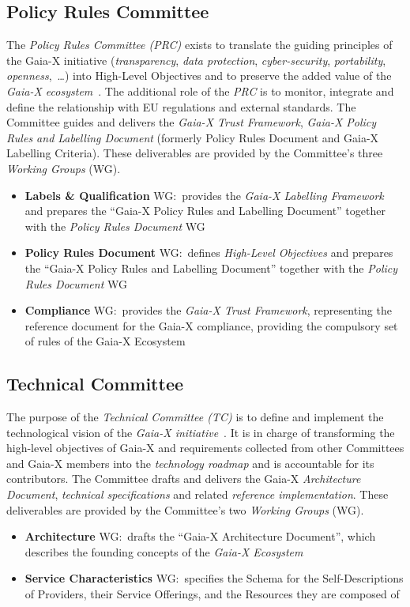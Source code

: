 \subsection{Policy Rules Committee}\label{subsec:policy-rules-committee}

The \textit{Policy Rules Committee (PRC)} exists to translate the guiding principles of the Gaia-X initiative (\textit{transparency}, \textit{data protection}, \textit{cyber-security}, \textit{portability}, \textit{openness},~\ldots) into High-Level Objectives and to preserve the added value of the \textit{Gaia-X ecosystem}~\cite{gaiax}.
The additional role of the \textit{PRC} is to monitor, integrate and define the relationship with EU regulations and external standards.
The Committee guides and delivers the \textit{Gaia-X Trust Framework}, \textit{Gaia-X Policy Rules and Labelling Document} (formerly Policy Rules Document and Gaia-X Labelling Criteria).
These deliverables are provided by the Committee's three \textit{Working Groups} (WG).
\begin{itemize}
    \item \textbf{Labels \& Qualification} WG:~provides the \textit{Gaia-X Labelling Framework} and prepares the ``Gaia-X Policy Rules and Labelling Document'' together with the \textit{Policy Rules Document} WG
    \item \textbf{Policy Rules Document} WG:~defines \textit{High-Level Objectives} and prepares the ``Gaia-X Policy Rules and Labelling Document'' together with the \textit{Policy Rules Document} WG
    \item \textbf{Compliance} WG:~provides the \textit{Gaia-X Trust Framework}, representing the reference document for the Gaia-X compliance, providing the compulsory set of rules of the Gaia-X Ecosystem
\end{itemize}

\subsection{Technical Committee}\label{subsec:technical-committee}

The purpose of the \textit{Technical Committee (TC)} is to define and implement the technological vision of the \textit{Gaia-X initiative}~\cite{gaiax}.
It is in charge of transforming the high-level objectives of Gaia-X and requirements collected from other Committees and Gaia-X members into the \textit{technology roadmap} and is accountable for its contributors.
The Committee drafts and delivers the Gaia-X \textit{Architecture Document}, \textit{technical specifications} and related \textit{reference implementation}.
These deliverables are provided by the Committee's two \textit{Working Groups} (WG).
\begin{itemize}
    \item \textbf{Architecture} WG:~drafts the ``Gaia-X Architecture Document'', which describes the founding concepts of the \textit{Gaia-X Ecosystem}
    \item \textbf{Service Characteristics} WG:~specifies the Schema for the Self-Descriptions of Providers, their Service Offerings, and the Resources they are composed of
\end{itemize}

